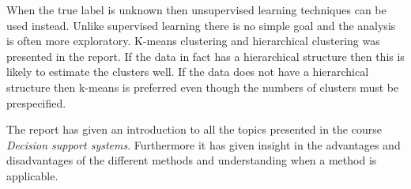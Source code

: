 When the true label is unknown then unsupervised learning techniques can be used instead. Unlike supervised learning there is no simple goal and the analysis is often more exploratory. K-means clustering and hierarchical clustering was presented in the report. If the data in fact has a hierarchical structure then this is likely to estimate the clusters well. If the data does not have a hierarchical structure then k-means is preferred even though the numbers of clusters must be prespecified. 

The report has given an introduction to all the topics presented in the course \emph{Decision support systems}. Furthermore it has given insight in the advantages and disadvantages of the different methods and understanding when a method is applicable.




